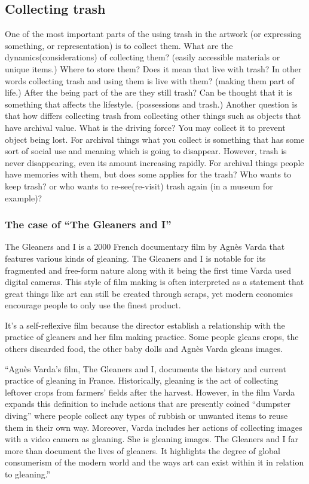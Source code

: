 \documentclass[12pt]{article}
\providecommand{\quotes}[1]{``#1''}
\begin{document}
\subsection{Collecting trash}
One of the most important parts of the using trash in the artwork (or expressing something, or representation) is to collect them. What are the dynamics(considerations) of collecting them? (easily accessible materials or unique items.) Where to store them? Does it mean that live with trash? In other words collecting trash and using them is live with them? (making them part of life.) After the being part of the are they still trash? Can be thought that it is something that affects the lifestyle. (possessions and trash.) Another question is that how differs collecting trash from collecting other things such as objects that have archival value. What is the driving force? You may collect it to prevent object being lost. For archival things what you collect is something that has some sort of social use and meaning which is going to disappear. However, trash is never disappearing, even its amount increasing rapidly. For archival things people have memories with them, but does some applies for the trash? Who wants to keep trash? or who wants to re-see(re-visit) trash again (in a museum for example)?

%
\subsubsection{The case of \quotes{The Gleaners and I}}
The Gleaners and I is a 2000 French documentary film by Agnès Varda that features various kinds of gleaning. The Gleaners and I is notable for its fragmented and free-form nature along with it being the first time Varda used digital cameras. This style of film making is often interpreted as a statement that great things like art can still be created through scraps, yet modern economies encourage people to only use the finest product.

It's a self-reflexive film because the director establish a relationship with the practice of gleaners and her film making practice. Some people gleans crops, the others discarded food, the other baby dolls and Agnès Varda gleans images.  

\quotes{Agnès Varda’s film, The Gleaners and I, documents the history and current practice of gleaning in France. Historically, gleaning is the act of collecting leftover crops from farmers’ fields after the harvest. However, in the film Varda expands this definition to include actions that are presently coined \quotes{dumpster diving} where people collect any types of rubbish or unwanted items to reuse them in their own way. Moreover, Varda includes her actions of collecting images with a video camera as gleaning. She is gleaning images. The Gleaners and I far more than document the lives of gleaners. It highlights the degree of global consumerism of the modern world and the ways art can exist within it in relation to gleaning.}
\end{document}
